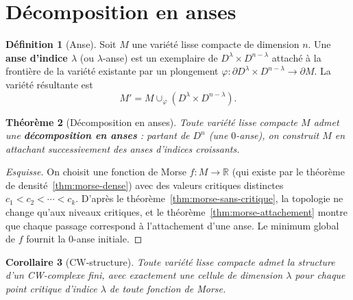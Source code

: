 \documentclass[12pt,a4paper,openany]{book}
\theoremstyle{definition}
\newtheorem{definition}{Définition}[chapter]
\theoremstyle{plain}
\newtheorem{theoreme}[definition]{Théorème}
\newtheorem{corollaire}[definition]{Corollaire}
\theoremstyle{remark}
\newcommand{\R}{\mathbb{R}}
\begin{document}
\section{Décomposition en anses}\label{sec:morse-anses}

\begin{definition}[Anse]\label{def:anse}
Soit $M$ une variété lisse compacte de dimension $n$. Une \textbf{anse d'indice
$\lambda$} (ou $\lambda$-anse) est un exemplaire de $D^\lambda \times D^{n-\lambda}$
attaché à la frontière de la variété existante par un plongement
$\varphi : \partial D^\lambda \times D^{n-\lambda} \to \partial M$. La variété
résultante est
\[
  M' = M \cup_\varphi (D^\lambda \times D^{n-\lambda}).
\]
\end{definition}

\begin{theoreme}[Décomposition en anses]\label{thm:decomp-anses}
Toute variété lisse compacte $M$ admet une \textbf{décomposition en anses} :
partant de $D^n$ (une $0$-anse), on construit $M$ en attachant successivement
des anses d'indices croissants.
\end{theoreme}

\begin{proof}[Esquisse]
On choisit une fonction de Morse $f : M \to \R$ (qui existe par le théorème de
densité~\ref{thm:morse-dense}) avec des valeurs critiques distinctes
$c_1 < c_2 < \cdots < c_k$. D'après le
théorème~\ref{thm:morse-sans-critique}, la topologie ne change qu'aux niveaux
critiques, et le théorème~\ref{thm:morse-attachement} montre que chaque passage
correspond à l'attachement d'une anse. Le minimum global de $f$ fournit la
$0$-anse initiale.
\end{proof}

\begin{corollaire}[CW-structure]\label{cor:morse-cw}
Toute variété lisse compacte admet la structure d'un CW-complexe fini, avec
exactement une cellule de dimension $\lambda$ pour chaque point critique d'indice
$\lambda$ de toute fonction de Morse.
\end{corollaire}
\end{document}
